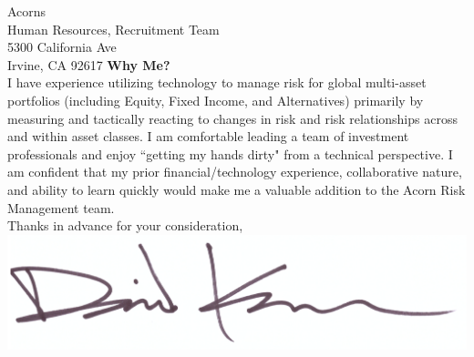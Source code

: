 \documentclass{letter}
\begin{document}
\begin{letter}{
  Acorns \\
  Human Resources, Recruitment Team \\
  5300 California Ave \\
  Irvine, CA 92617
}
\textbf{Why Me?} \\
I have experience utilizing technology to manage risk for global multi-asset
portfolios (including Equity, Fixed Income, and Alternatives) primarily by
measuring and tactically reacting to changes in risk and risk relationships
across and within asset classes. I am comfortable leading a team of investment
professionals and enjoy ``getting my hands dirty" from a technical perspective.
I am confident that my prior financial/technology experience, collaborative
nature, and ability to learn quickly would make me a valuable addition to the
Acorn Risk Management team. \\ 

\centering
Thanks in advance for your consideration, \\
\includegraphics[scale=0.33]{signature.png}

\end{letter}
\end{document}
